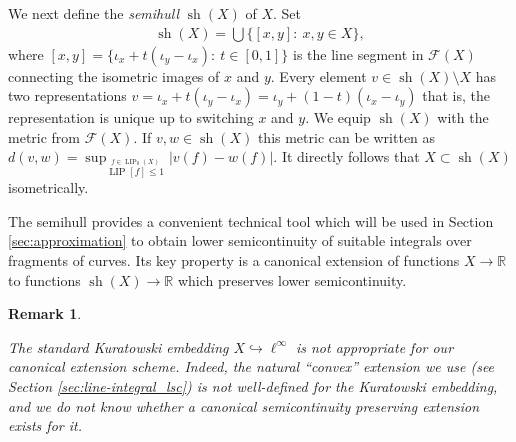 \documentclass{amsart}
\newtheorem{remark}[theorem]{Remark}
\numberwithin{equation}{section}
\newcommand{\R}{\mathbb{R}}
\newcommand{\LIP}{\operatorname{LIP}}
\newcommand{\sh}{\operatorname{sh}}
\begin{document}
We next define the \emph{semihull} $\sh(X)$ of $X$. Set
\begin{align*}
\sh(X)=\bigcup\{[x,y]:\ x,y\in X  \},
\end{align*}
where $[x,y]=\{\iota_x+t(\iota_y-\iota_x):\ t\in [0,1]\}$ is the line segment in $\mathcal F(X)$ connecting the isometric images of $x$ and $y$. Every element $v\in \sh(X)\setminus X$ has two representations $v=\iota_x+t(\iota_y-\iota_x)=\iota_{y}+(1-t)(\iota_{x}-\iota_{y})$ that is, the representation is unique up to switching $x$ and $y$. We equip $\sh(X)$ with the metric from $\mathcal F(X)$. If $v,w\in \sh(X)$ this metric can be written as $d(v,w)=\sup_{\stackrel{f\in \LIP_0(X)}{\LIP[f]\leq 1}} |v(f)-w(f)|$.  It directly follows that $X\subset \sh(X)$ isometrically.

The semihull provides a convenient technical tool which will be used in Section \ref{sec:approximation} to obtain lower semicontinuity of suitable integrals over fragments of curves. Its key property is a canonical extension of functions $X\to \R$ to functions $\sh(X)\to \R$ which preserves lower semicontinuity.



\begin{remark}\label{AE-better}
 

The standard Kuratowski embedding $X\hookrightarrow \ell^\infty$ is not appropriate for our canonical extension scheme. Indeed, the natural ``convex'' extension we use (see Section \ref{sec:line-integral_lsc}) 
is not well-defined for the Kuratowski embedding, and we do not know whether a canonical semicontinuity preserving extension exists for it. 

\end{remark}
\end{document}
